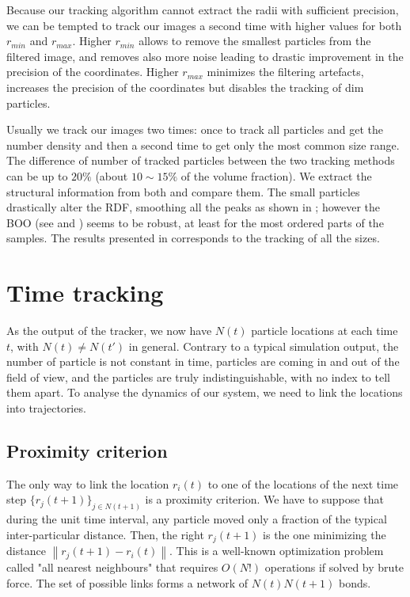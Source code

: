 Because our tracking algorithm cannot extract the radii with sufficient precision, we can be tempted to track our images a second time with higher values for both $r_{min}$ and $r_{max}$. Higher $r_{min}$ allows to remove the smallest particles from the filtered image, and removes also more noise leading to drastic improvement in the precision of the coordinates. Higher $r_{max}$ minimizes the filtering artefacts, increases the precision of the coordinates but disables the tracking of dim particles.

Usually we track our images two times: once to track all particles and get the number density and then a second time to get only the most common size range. The difference of number of tracked particles between the two tracking methods can be up to $20\%$ (about $10\sim15\%$ of the volume fraction). We extract the structural information from both and compare them. The small particles drastically alter the \ac{RDF}, smoothing all the peaks as shown in ; however the \acl{BOO} (see  and ) seems to be robust, at least for the most ordered parts of the samples. The results presented in  corresponds to the tracking of all the sizes.

\section{Time tracking}
\label{sec:time_tracking}

As the output of the tracker, we now have $N(t)$ particle locations at each time $t$, with $N(t) \neq N(t')$ in general. Contrary to a typical simulation output, the number of particle is not constant in time, particles are coming in and out of the field of view, and the particles are truly indistinguishable, with no index to tell them apart. To analyse the dynamics of our system, we need to link the locations into trajectories.

\subsection{Proximity criterion}

The only way to link the location $r_i(t)$ to one of the locations of the next time step $\lbrace r_j(t+1) \rbrace_{j\in N(t+1)}$ is a proximity criterion. We have to suppose that during the unit time interval, any particle moved only a fraction of the typical inter-particular distance. Then, the right $r_j(t+1)$ is the one minimizing the distance $\left\| r_j(t+1) - r_i(t)\right\|$. This is a well-known optimization problem called "all nearest neighbours" that requires $O(N!)$ operations if solved by brute force. The set of possible links forms a network of $N(t)N(t+1)$ bonds.

